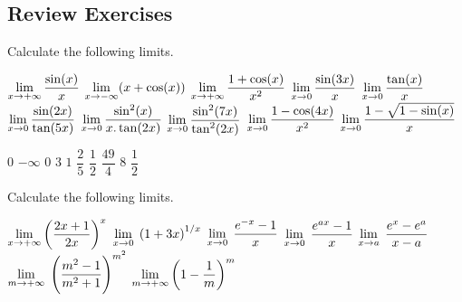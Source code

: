 \subsection*{Review Exercises}
\begin{Exercise} Calculate the following limits.
 \begin{multicols}{2}
		\Question[difficulty = 1] $\displaystyle\lim_{x\rightarrow+\infty}\dfrac{\sin (x)}{x}$
		\Question[difficulty = 1] $\displaystyle\lim_{x\rightarrow-\infty}(x+\cos (x))$
		\Question[difficulty = 1] $\displaystyle\lim_{x\rightarrow+\infty}\dfrac{1+\cos (x)}{x^2}$
		\Question[difficulty = 1] $\displaystyle\lim_{x\rightarrow 0}\dfrac{\sin (3x)}{x}$
		\ifanalysis\Question[difficulty = 1]\fi\ifcalculus\Question[difficulty = 2]\fi $\displaystyle\lim_{x\rightarrow 0}\dfrac{\tan (x)}{x}$
		\Question[difficulty = 2] $\displaystyle\lim_{x\rightarrow 0}\dfrac{\sin (2x)}{\tan (5x)}$
		\Question[difficulty = 2] $\displaystyle\lim_{x\rightarrow 0}\dfrac{\sin^2 (x)}{x.\tan (2x)}$
		\Question[difficulty = 2] $\displaystyle\lim_{x\rightarrow 0}\dfrac{\sin^2 (7x)}{\tan^2 (2x)}$
		\ifanalysis\Question[difficulty = 1]\fi\ifcalculus\Question[difficulty = 2]\fi $\displaystyle\lim_{x\rightarrow 0}\dfrac{1-\cos (4x)}{x^2}$
		\Question[difficulty = 2] $\displaystyle\lim_{x\rightarrow 0}\dfrac{1-\sqrt{1-\sin (x)}}{x}$
        \EndCurrentQuestion
\end{multicols}

\end{Exercise}

\begin{Answer}\phantom{}
    	\begin{multicols}{3}
    		
    		\Question $0$
    		\Question $-\infty$
    		\Question $0$
    		\Question $3$
    		\Question $1$
    		\Question $\dfrac{2}{5}$
    		\Question $\dfrac{1}{2}$	
    		\Question $\dfrac{49}{4}$
    		\Question $8$
    		\Question $\dfrac{1}{2}$
    		\EndCurrentQuestion
	    \end{multicols}
\end{Answer}

\begin{Exercise} Calculate the following limits.
\begin{multicols}{2}
		\Question[difficulty = 1] $\displaystyle\lim_{x\rightarrow +\infty}\left( \dfrac{2x+1}{2x}\right)^x$
		\Question[difficulty = 1] $\displaystyle\lim_{x\rightarrow 0} \; \left(1+3x\right)^{1/x}$
		\Question[difficulty = 1] $\displaystyle\lim_{x\rightarrow 0} \; \dfrac{e^{-x}-1}{x}$
		\Question[difficulty = 1] $\displaystyle\lim_{x\rightarrow 0} \; \dfrac{e^{ax}-1}{x}$
        \ifanalysis
        \Question[difficulty = 2] $\displaystyle\lim_{x\rightarrow a} \; \dfrac{e^{x}-e^{a}}{x-a}$
    	\Question[difficulty = 2] $\displaystyle\lim_{m\rightarrow +\infty} \; \left( \dfrac{m^2-1}{m^2+1}\right)^{m^2}$
    	\Question[difficulty = 1]$\displaystyle\lim_{m\rightarrow +\infty} \left( 1-\dfrac{1}{m}\right)^m$
        \fi
        \EndCurrentQuestion 
\end{multicols}

\end{Exercise}


